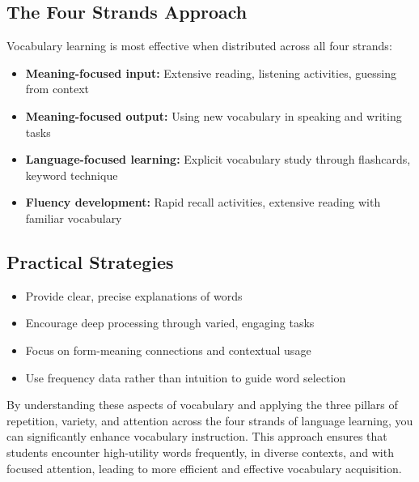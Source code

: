 \subsection*{The Four Strands Approach}

Vocabulary learning is most effective when distributed across all four strands:

\begin{itemize}
\item \textbf{Meaning-focused input:} Extensive reading, listening activities, guessing from context
\item \textbf{Meaning-focused output:} Using new vocabulary in speaking and writing tasks
\item \textbf{Language-focused learning:} Explicit vocabulary study through flashcards, keyword technique
\item \textbf{Fluency development:} Rapid recall activities, extensive reading with familiar vocabulary
\end{itemize}

\subsection*{Practical Strategies}

\begin{itemize}
\item Provide clear, precise explanations of words
\item Encourage deep processing through varied, engaging tasks
\item Focus on form-meaning connections and contextual usage
\item Use frequency data rather than intuition to guide word selection
\end{itemize}

By understanding these aspects of vocabulary and applying the three pillars of repetition, variety, and attention across the four strands of language learning, you can significantly enhance vocabulary instruction. This approach ensures that students encounter high-utility words frequently, in diverse contexts, and with focused attention, leading to more efficient and effective vocabulary acquisition.